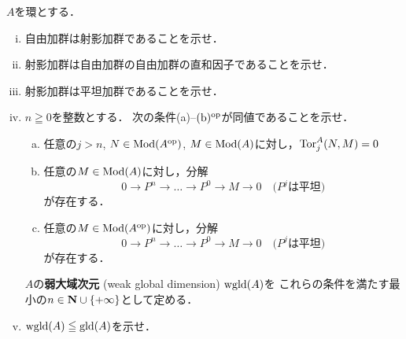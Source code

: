 \begin{leftbar}
\begin{EXC}[弱大域次元]\label{EXC129}
    \(A\)を環とする．
    \begin{enumerate}[(i)]
        \item 自由加群は射影加群であることを示せ．
        \item 射影加群は自由加群の自由加群の直和因子であることを示せ．
        \item 射影加群は平坦加群であることを示せ．
        \item \(n\geqq0\)を整数とする．
            次の条件(a)--\((\text{b})^{\op}\)が同値であることを示せ．
            \begin{enumerate}[(a)]
                \item 任意の\(j>n\), \(N\in\mathop{\mathrm{Mod}}\nolimits(A^{\rm op})\), 
                \(M\in\mathop{\mathrm{Mod}}\nolimits(A)\)に対し，\(\mathop{\mathrm{Tor}}\nolimits_j^A(N,M)=0\)
                \item 任意の\(M\in\mathop{\mathrm{Mod}}\nolimits(A)\)に対し，分解\[
                    0\to P^n\to\dots\to P^0\to M\to0\quad\text{(\(P^j\)は平坦)}
                    \]が存在する．
                \item[\((\text{b})^{\op}\)]\setlength{\leftskip}{10pt}
                任意の\(M\in\mathop{\mathrm{Mod}}\nolimits(A^{\rm op})\)に対し，分解\[
                    0\to P^n\to\dots\to P^0\to M\to0\quad\text{(\(P^j\)は平坦)}
                \]が存在する．
            \end{enumerate}
            \(A\)の\textbf{弱大域次元} (weak global dimension) \(\mathop{\mathrm{wgld}}\nolimits(A)\)を
            これらの条件を満たす最小の\(n\in\mathbf{N}\cup\{+\infty\}\)として定める．
        \item \(\mathop{\mathrm{wgld}}\nolimits(A)\leqq\mathop{\mathrm{gld}}\nolimits(A)\)を示せ．
    \end{enumerate}
\end{EXC}
\end{leftbar}
